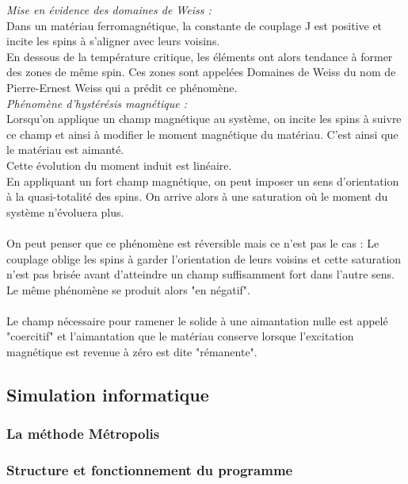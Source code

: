 \emph{Mise en évidence des domaines de Weiss :}\\
Dans un matériau ferromagnétique, la constante de couplage J est positive et incite les spins à s'aligner avec leurs voisins.\\
En dessous de la température critique, les éléments ont alors tendance à former des zones de même spin. Ces zones sont appelées Domaines de Weiss du nom de Pierre-Ernest Weiss qui a prédit ce phénomène.\\


\emph{Phénomène d'hystérésis magnétique :}\\
Lorsqu'on applique un champ magnétique au système, on incite les spins à suivre ce champ et ainsi à modifier le moment magnétique du matériau. C'est ainsi que le matériau est aimanté.\\
Cette évolution du moment induit est linéaire.\\
En appliquant un fort champ magnétique, on peut imposer un sens d'orientation à la quasi-totalité des spins. On arrive alors à une saturation où le moment du système n'évoluera plus.\\
\\
On peut penser que ce phénomène est réversible mais ce n'est pas le cas : Le couplage oblige les spins à garder l'orientation de leurs voisins et cette saturation n'est pas brisée avant d'atteindre un champ suffisamment fort dans l'autre sens. Le même phénomène se produit alors "en négatif".\\
\\
Le champ nécessaire pour ramener le solide à une aimantation nulle est appelé "coercitif" et l'aimantation que le matériau conserve lorsque l'excitation magnétique est revenue à zéro est dite "rémanente".\\

\vspace{\parskip} %

\subsection{Simulation informatique}

\subsubsection{La méthode Métropolis}

\subsubsection{Structure et fonctionnement du programme}


